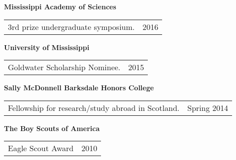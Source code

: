 {\bf{Mississippi Academy of Sciences}}\\
\begin{tabular}{@{}p{4in}p{2in}}
3rd prize undergraduate symposium. & 2016\\
\end{tabular}

{\bf{University of Mississippi}}\\
\begin{tabular}{@{}p{4in}p{2in}}
Goldwater Scholarship Nominee. & 2015\\
\end{tabular}

{\bf{Sally McDonnell Barksdale Honors College}}\\
\begin{tabular}{@{}p{4in}p{2in}}
Fellowship for research/study abroad in Scotland. & Spring 2014\\
\end{tabular}

{\bf{The Boy Scouts of America}}\\
\begin{tabular}{@{}p{4in}p{2in}}
Eagle Scout Award & 2010\\
\end{tabular}


\endinput